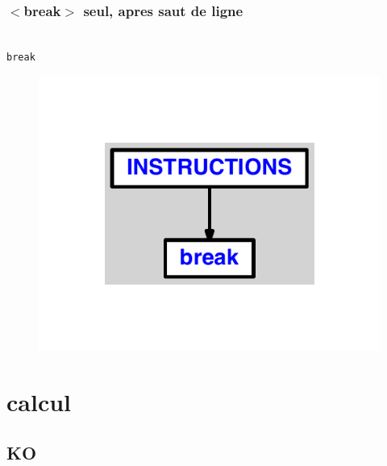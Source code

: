 \documentclass{article}
\begin{document}
\subsubsection{$ < $break$ > $ seul, apres saut de ligne}
\begin{lstlisting}

break
\end{lstlisting}
\newpage
\begin{figure}[H]
\centering
\includegraphics[max width=\textwidth]{ast/ast_21.pdf}
\end{figure}
\newpage
\section{calcul}
\subsection{KO}
\end{document}
